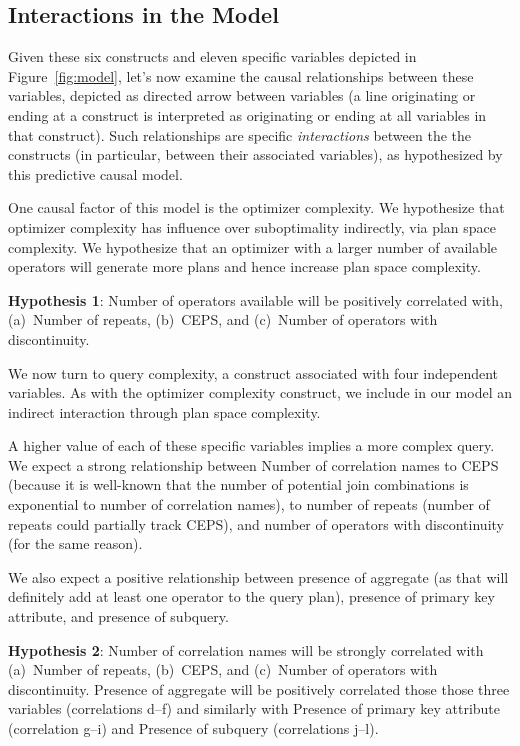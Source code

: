 \documentclass[prodmode,acmtods]{acmsmall}
\begin{document}
\subsection{Interactions in the Model}\label{sec:interactions}
Given these six constructs and eleven specific variables depicted in
Figure~\ref{fig:model}, let's now examine the causal relationships between
these variables, depicted as directed arrow between variables (a line
originating or ending at a construct is interpreted as originating or ending at all
variables in that construct). Such relationships are specific {\em interactions} between
the the constructs (in particular, between their associated variables), as hypothesized by
this predictive causal model.

One causal factor of this model is the optimizer complexity. We hypothesize
that optimizer complexity has influence over suboptimality indirectly, via
plan space complexity. We hypothesize that an optimizer with a larger number
of available operators will generate more plans and hence increase plan
space complexity.

\vspace{0.6em}\noindent
{\bf Hypothesis 1}: Number of operators available will be positively correlated with, (a)~Number of
repeats, (b)~CEPS, and (c)~Number of operators with discontinuity.

\vspace{0.6em}We now turn to query complexity, a construct associated with four
independent variables. As with the optimizer complexity construct, we
include in our model an
indirect interaction through plan space complexity.

A higher value of each of these specific variables implies a more complex
query.  We expect a strong relationship between Number of correlation names
to CEPS (because it is well-known that the number of potential join
combinations is exponential to number of correlation names), to number of
repeats (number of repeats could partially track CEPS), and number of
operators with discontinuity (for the same reason).

We also expect a positive relationship between presence of aggregate (as
that will definitely add at least one operator to the query plan), presence
of primary key attribute, and
presence of subquery.

\vspace{0.6em}\noindent
{\bf Hypothesis 2}: Number of correlation names will be
strongly correlated with (a)~Number of repeats, (b)~CEPS, and (c)~Number of
operators with discontinuity. Presence of aggregate will be positively
correlated those those three variables (correlations d--f) and similarly
with Presence of primary key attribute
(correlation g--i) and Presence of subquery (correlations j--l).
\end{document}
